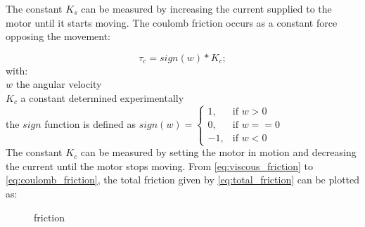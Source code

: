 The constant $K_s$ can be measured by increasing the current supplied to the motor until it starts moving. 
The coulomb friction occurs as a constant force opposing the movement:

\begin{equation}
\tau_c = sign(w)*K_c;
\label{eq:coulomb_friction}
\end{equation}
with:\\
\hspace*{8mm}$w$ the angular velocity\\
\hspace*{8mm}$K_c$ a constant determined experimentally\\
\hspace*{8mm}the $sign$ function is defined as $sign(w) = \begin{cases} 1, & \mbox{if } w > 0 \\ 0, & \mbox{if } w == 0 \\ -1, & \mbox{if } w < 0\end{cases}$\\

The constant $K_c$ can be measured by setting the motor in motion and decreasing the current until the motor stops moving.
From \eqref{eq:viscous_friction} to \eqref{eq:coulomb_friction}, the total friction given by \eqref{eq:total_friction} can be plotted as:

\begin{figure}
\centering
\caption{friction}
\end{figure}
